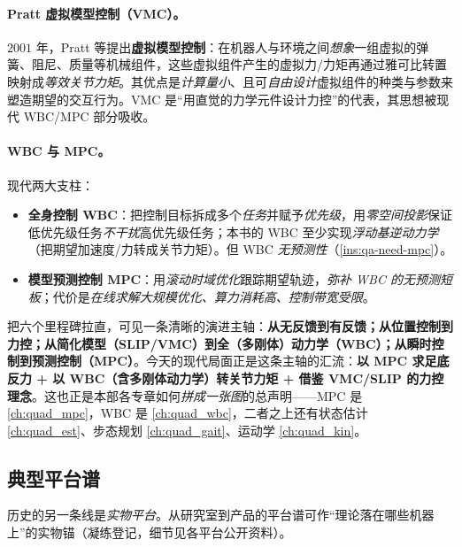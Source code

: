\paragraph{ Pratt 虚拟模型控制（VMC）。}
$2001$ 年，Pratt 等提出\textbf{虚拟模型控制}\cite{pratt2001virtual}：在机器人与环境之间\emph{想象}一组虚拟的弹簧、阻尼、质量等机械组件，这些虚拟组件产生的虚拟力/力矩再通过雅可比转置映射成\emph{等效关节力矩}。其优点是\emph{计算量小}、且可\emph{自由设计}虚拟组件的种类与参数来塑造期望的交互行为\cite{yu2021quadruped}。VMC 是“用直觉的力学元件设计力控”的代表，其思想被现代 WBC/MPC 部分吸收。

\paragraph{ WBC 与 MPC。}
现代两大支柱：
\begin{itemize}
  \item \textbf{全身控制 WBC}：把控制目标拆成多个\emph{任务}并赋予\emph{优先级}，用\emph{零空间投影}保证低优先级任务\emph{不干扰}高优先级任务；本书的 WBC 至少实现\emph{浮动基逆动力学}（把期望加速度/力转成关节力矩）\cite{yu2021quadruped}。但 WBC \emph{无预测性}（\cref{ins:qa-need-mpc}）。
  \item \textbf{模型预测控制 MPC}：用\emph{滚动时域优化}跟踪期望轨迹，\emph{弥补 WBC 的无预测短板}；代价是\emph{在线求解大规模优化、算力消耗高、控制带宽受限}\cite{yu2021quadruped}。
\end{itemize}

\begin{insight}\label{ins:qa-evolution}
把六个里程碑拉直，可见一条清晰的演进主轴：\textbf{从无反馈到有反馈；从位置控制到力控；从简化模型（SLIP/VMC）到全（多刚体）动力学（WBC）；从瞬时控制到预测控制（MPC）}。今天的现代局面正是这条主轴的汇流：\textbf{以 MPC 求足底反力 + 以 WBC（含多刚体动力学）转关节力矩 + 借鉴 VMC/SLIP 的力控理念}\cite{yu2021quadruped}。这也正是本部各专章如何\emph{拼成一张图}的总声明——MPC 是 \cref{ch:quad_mpc}，WBC 是 \cref{ch:quad_wbc}，二者之上还有状态估计 \cref{ch:quad_est}、步态规划 \cref{ch:quad_gait}、运动学 \cref{ch:quad_kin}。
\end{insight}

\subsection{典型平台谱}
\label{subsec:qa-platforms}

历史的另一条线是\emph{实物平台}。从研究室到产品的平台谱可作“理论落在哪些机器上”的实物锚（凝练登记，细节见各平台公开资料）\cite{unitree2023quadruped}。

